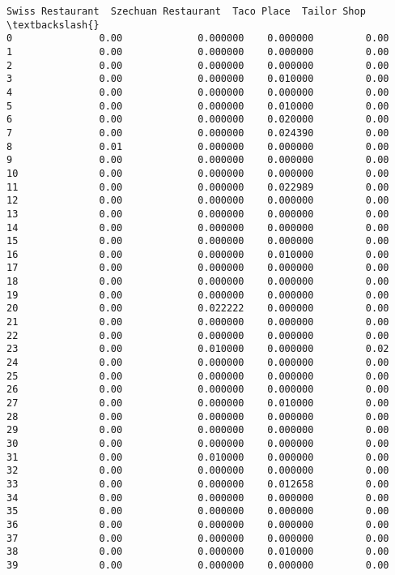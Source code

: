 \documentclass[11pt]{article}
\begin{document}
\begin{tcolorbox}[breakable, size=fbox, boxrule=.5pt, pad at break*=1mm, opacityfill=0]
\begin{Verbatim}[commandchars=\\\{\}]
    Swiss Restaurant  Szechuan Restaurant  Taco Place  Tailor Shop  \textbackslash{}
0               0.00             0.000000    0.000000         0.00
1               0.00             0.000000    0.000000         0.00
2               0.00             0.000000    0.000000         0.00
3               0.00             0.000000    0.010000         0.00
4               0.00             0.000000    0.000000         0.00
5               0.00             0.000000    0.010000         0.00
6               0.00             0.000000    0.020000         0.00
7               0.00             0.000000    0.024390         0.00
8               0.01             0.000000    0.000000         0.00
9               0.00             0.000000    0.000000         0.00
10              0.00             0.000000    0.000000         0.00
11              0.00             0.000000    0.022989         0.00
12              0.00             0.000000    0.000000         0.00
13              0.00             0.000000    0.000000         0.00
14              0.00             0.000000    0.000000         0.00
15              0.00             0.000000    0.000000         0.00
16              0.00             0.000000    0.010000         0.00
17              0.00             0.000000    0.000000         0.00
18              0.00             0.000000    0.000000         0.00
19              0.00             0.000000    0.000000         0.00
20              0.00             0.022222    0.000000         0.00
21              0.00             0.000000    0.000000         0.00
22              0.00             0.000000    0.000000         0.00
23              0.00             0.010000    0.000000         0.02
24              0.00             0.000000    0.000000         0.00
25              0.00             0.000000    0.000000         0.00
26              0.00             0.000000    0.000000         0.00
27              0.00             0.000000    0.010000         0.00
28              0.00             0.000000    0.000000         0.00
29              0.00             0.000000    0.000000         0.00
30              0.00             0.000000    0.000000         0.00
31              0.00             0.010000    0.000000         0.00
32              0.00             0.000000    0.000000         0.00
33              0.00             0.000000    0.012658         0.00
34              0.00             0.000000    0.000000         0.00
35              0.00             0.000000    0.000000         0.00
36              0.00             0.000000    0.000000         0.00
37              0.00             0.000000    0.000000         0.00
38              0.00             0.000000    0.010000         0.00
39              0.00             0.000000    0.000000         0.00


\end{Verbatim}
\end{tcolorbox}
\end{document}
